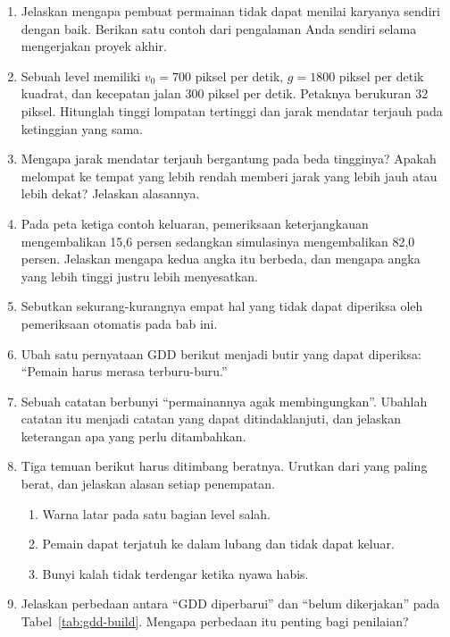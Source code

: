 
\begin{enumerate}
  \item Jelaskan mengapa pembuat permainan tidak dapat menilai karyanya
        sendiri dengan baik. Berikan satu contoh dari pengalaman Anda sendiri
        selama mengerjakan proyek akhir.

  \item Sebuah level memiliki $v_0 = 700$ piksel per detik, $g = 1800$ piksel
        per detik kuadrat, dan kecepatan jalan 300 piksel per detik. Petaknya
        berukuran 32 piksel. Hitunglah tinggi lompatan tertinggi dan jarak
        mendatar terjauh pada ketinggian yang sama.

  \item Mengapa jarak mendatar terjauh bergantung pada beda tingginya?
        Apakah melompat ke tempat yang lebih rendah memberi jarak yang lebih
        jauh atau lebih dekat? Jelaskan alasannya.

  \item Pada peta ketiga contoh keluaran, pemeriksaan keterjangkauan
        mengembalikan 15,6 persen sedangkan simulasinya mengembalikan 82,0
        persen. Jelaskan mengapa kedua angka itu berbeda, dan mengapa angka
        yang lebih tinggi justru lebih menyesatkan.

  \item Sebutkan sekurang-kurangnya empat hal yang tidak dapat diperiksa oleh
        pemeriksaan otomatis pada bab ini.

  \item Ubah satu pernyataan GDD berikut menjadi butir 
        yang dapat diperiksa: ``Pemain harus merasa terburu-buru.''

  \item Sebuah catatan  berbunyi ``permainannya agak
        membingungkan''. Ubahlah catatan itu menjadi catatan yang dapat
        ditindaklanjuti, dan jelaskan keterangan apa yang perlu ditambahkan.

  \item Tiga temuan berikut harus ditimbang beratnya. Urutkan dari yang paling
        berat, dan jelaskan alasan setiap penempatan.
        \begin{enumerate}
          \item Warna latar pada satu bagian level salah.
          \item Pemain dapat terjatuh ke dalam lubang dan tidak dapat keluar.
          \item Bunyi kalah tidak terdengar ketika nyawa habis.
        \end{enumerate}

  \item Jelaskan perbedaan antara ``GDD diperbarui'' dan ``belum dikerjakan''
        pada Tabel~\ref{tab:gdd-build}. Mengapa perbedaan itu penting bagi
        penilaian?
\end{enumerate}

